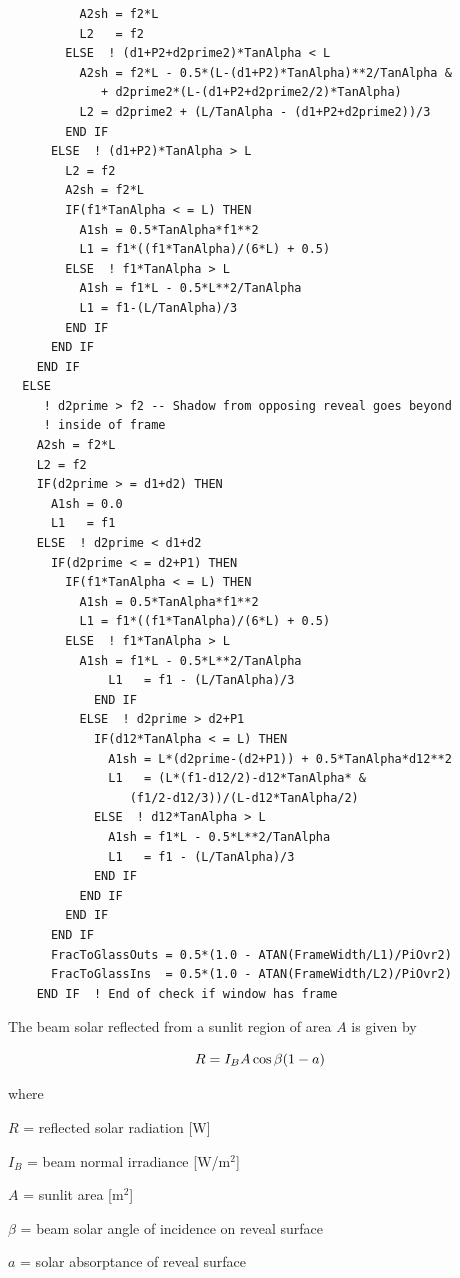 \begin{lstlisting}
          A2sh = f2*L
          L2   = f2
        ELSE  ! (d1+P2+d2prime2)*TanAlpha < L
          A2sh = f2*L - 0.5*(L-(d1+P2)*TanAlpha)**2/TanAlpha &
             + d2prime2*(L-(d1+P2+d2prime2/2)*TanAlpha)
          L2 = d2prime2 + (L/TanAlpha - (d1+P2+d2prime2))/3
        END IF
      ELSE  ! (d1+P2)*TanAlpha > L
        L2 = f2
        A2sh = f2*L
        IF(f1*TanAlpha < = L) THEN
          A1sh = 0.5*TanAlpha*f1**2
          L1 = f1*((f1*TanAlpha)/(6*L) + 0.5)
        ELSE  ! f1*TanAlpha > L
          A1sh = f1*L - 0.5*L**2/TanAlpha
          L1 = f1-(L/TanAlpha)/3
        END IF
      END IF
    END IF
  ELSE
     ! d2prime > f2 -- Shadow from opposing reveal goes beyond
     ! inside of frame
    A2sh = f2*L
    L2 = f2
    IF(d2prime > = d1+d2) THEN
      A1sh = 0.0
      L1   = f1
    ELSE  ! d2prime < d1+d2
      IF(d2prime < = d2+P1) THEN
        IF(f1*TanAlpha < = L) THEN
          A1sh = 0.5*TanAlpha*f1**2
          L1 = f1*((f1*TanAlpha)/(6*L) + 0.5)
        ELSE  ! f1*TanAlpha > L
          A1sh = f1*L - 0.5*L**2/TanAlpha
              L1   = f1 - (L/TanAlpha)/3
            END IF
          ELSE  ! d2prime > d2+P1
            IF(d12*TanAlpha < = L) THEN
              A1sh = L*(d2prime-(d2+P1)) + 0.5*TanAlpha*d12**2
              L1   = (L*(f1-d12/2)-d12*TanAlpha* &
                 (f1/2-d12/3))/(L-d12*TanAlpha/2)
            ELSE  ! d12*TanAlpha > L
              A1sh = f1*L - 0.5*L**2/TanAlpha
              L1   = f1 - (L/TanAlpha)/3
            END IF
          END IF
        END IF
      END IF
      FracToGlassOuts = 0.5*(1.0 - ATAN(FrameWidth/L1)/PiOvr2)
      FracToGlassIns  = 0.5*(1.0 - ATAN(FrameWidth/L2)/PiOvr2)
    END IF  ! End of check if window has frame
\end{lstlisting}

The beam solar reflected from a sunlit region of area \(A\) is given by

\begin{equation}
R = {I_B}A\cos \beta (1 - a){\rm{ }}
\end{equation}

where

\(R\) = reflected solar radiation {[}W{]}

\({I_B}\) = beam normal irradiance {[}W/m\(^{2}\){]}

\(A\) = sunlit area {[}m\(^{2}\){]}

\(\beta\) = beam solar angle of incidence on reveal surface

\(a\) = solar absorptance of reveal surface

